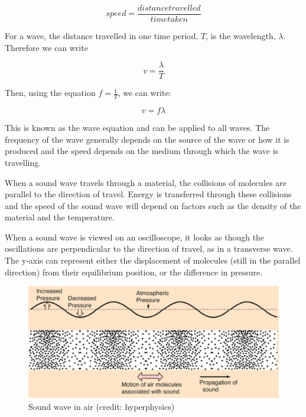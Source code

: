 \documentclass[main.tex]{subfiles}
\begin{document}

$$speed = \frac{distance travelled}{time taken}$$

For a wave, the distance travelled in one time period, $T$, is the wavelength, $\lambda$. Therefore we can write

\[v = \frac{\lambda}{T}\]

Then, using the equation $f=\frac{1}{T}$, we can write:

$$v = f\lambda$$

This is known as the wave equation and can be applied to all waves. The frequency of the wave generally depends on the source of the wave or how it is produced and the speed depends on the medium through which the wave is travelling.


When a sound wave travels through a material, the collisions of molecules are parallel to the direction of travel. Energy is transferred through these collisions and the speed of the sound wave will depend on factors such as the density of the material and the temperature.

When a sound wave is viewed on an oscilloscope, it looks as though the oscillations are perpendicular to the direction of travel, as in a transverse wave. The y-axis can represent either the displacement of molecules (still in the parallel direction) from their equilibrium position, or the difference in pressure.

\begin{figure}[h]
\includegraphics[width=\textwidth]{figs/chapt-6/soundwave.JPG}
\caption{Sound wave in air (credit: hyperphysics)}
\label{Sound wave in air}
\end{figure}

\end{document}
